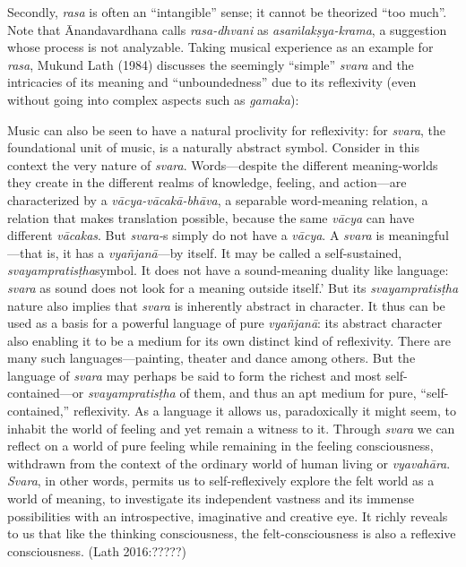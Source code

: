 \newpage

Secondly, \textsl{rasa} is often an “intangible” sense; it cannot be theorized “too much”. Note that Ānandavardhana calls \textsl{rasa-dhvani}
 as \textsl{asaṁlakṣya-krama}, a suggestion whose process is not analyzable. Taking musical experience as an example for \textsl{rasa}, Mukund Lath (1984) discusses the seemingly “simple” \textsl{svara} and the intricacies of its meaning and “unboundedness” due to its reflexivity (even without going into complex aspects such as \textsl{gamaka}):

\begin{myquote}
Music can also be seen to have a natural proclivity for reflexivity: for \textsl{svara}, the foundational unit of music, is a naturally abstract symbol. Consider in this context the very nature of \textsl{svara}. Words—despite the different meaning-worlds they create in the different realms of knowledge, feeling, and action—are characterized by a \textsl{vācya-vācakā-bhāva}, a separable word-meaning relation, a relation that makes translation possible, because the same \textsl{vācya} can have different \textsl{vācakas}. But \textsl{svara-}s simply do not have a \textsl{vācya}. A \textsl{svara} is meaningful—that is, it has a \textsl{vyañjanā}---by itself. It may be called a self-sustained, \textsl{svayampratisṭha}symbol. It does not have a sound-meaning duality like language: \textsl{svara} as sound does not look for a meaning outside itself.' But its \textsl{svayampratisṭha} nature also implies that \textsl{svara} is inherently abstract in character. It thus can be used as a basis for a powerful language of pure \textsl{vyañjanā}: its abstract character also enabling it to be a medium for its own distinct kind of reflexivity. There are many such languages—painting, theater and dance among others. But the language of \textsl{svara} may perhaps be said to form the richest and most self-contained—or \textsl{svayampratisṭha} of them, and thus an apt medium for pure, “self-contained,” reflexivity. As a language it allows us, paradoxically it might seem, to inhabit the world of feeling and yet remain a witness to it. Through \textsl{svara} we can reflect on a world of pure feeling while remaining in the feeling consciousness, withdrawn from the context of the ordinary world of human living or \textsl{vyavahāra}. \textsl{Svara}, in other words, permits us to self-reflexively explore the felt world as a world of meaning, to investigate its independent vastness and its immense possibilities with an introspective, imaginative and creative eye. It richly reveals to us that like the thinking consciousness, the felt-consciousness is also a reflexive consciousness. 
\hfill(Lath 2016:?????)
\end{myquote}

